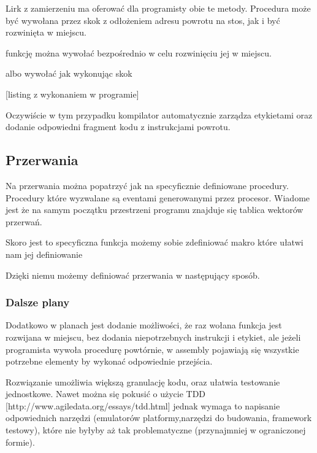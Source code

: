 \documentclass[11pt]{article}
\begin{document}
Lirk z zamierzeniu ma oferować dla programisty obie te metody. Procedura może być wywołana przez skok z odłożeniem adresu powrotu na stos, jak i być rozwinięta w miejscu.

funkcję można wywołać bezpośrednio w celu rozwinięciu jej w miejscu.
\newpage

\begin{multicols}{2}

\columnbreak

\end{multicols}

albo wywołać jak wykonując skok

[listing z wykonaniem w programie]
\begin{multicols}{2}

\columnbreak

\end{multicols}

Oczywiście w tym przypadku kompilator automatycznie zarządza etykietami oraz dodanie odpowiedni fragment kodu z instrukcjami powrotu.

\subsection{Przerwania}

Na przerwania można popatrzyć jak na specyficznie definiowane procedury. Procedury które wyzwalane są eventami generowanymi przez procesor. Wiadome jest że na samym początku przestrzeni programu znajduje się tablica wektorów przerwań.

Skoro jest to specyficzna funkcja możemy sobie zdefiniować makro które ułatwi nam jej definiowanie




Dzięki niemu możemy definiować przerwania w następujący sposób.



\subsubsection{Dalsze plany}

Dodatkowo w planach jest dodanie możliwości, że raz wołana funkcja jest rozwijana w miejscu, bez dodania niepotrzebnych instrukcji i etykiet, ale jeżeli programista wywoła procedurę powtórnie, w assembly pojawiają się wszystkie potrzebne elementy by wykonać odpowiednie przejścia.

Rozwiązanie umożliwia większą granulację kodu, oraz ułatwia testowanie jednostkowe. Nawet można się pokusić o użycie TDD [http://www.agiledata.org/essays/tdd.html] jednak wymaga to napisanie odpowiednich narzędzi (emulatorów platformy,narzędzi do budowania, framework testowy), które nie byłyby aż tak problematyczne (przynajmniej w ograniczonej formie).
\end{document}
